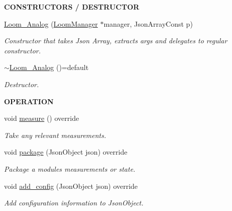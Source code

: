 \begin{Indent}{\bf C\+O\+N\+S\+T\+R\+U\+C\+T\+O\+RS / D\+E\+S\+T\+R\+U\+C\+T\+OR}
\begin{DoxyCompactItemize}
\hyperlink{class_loom___analog_a617a6b9c093fb8bb54abd3e55d051c0a}{Loom\+\_\+\+Analog} (\hyperlink{class_loom_manager}{Loom\+Manager} $\ast$manager, Json\+Array\+Const p)
\begin{DoxyCompactList}\small\item\em Constructor that takes Json Array, extracts args and delegates to regular constructor. \end{DoxyCompactList}\item 
\hyperlink{class_loom___analog_aa8d2a87c4c6ae72c1a943b95c96f2b53}{$\sim$\+Loom\+\_\+\+Analog} ()=default
\begin{DoxyCompactList}\small\item\em Destructor. \end{DoxyCompactList}\end{DoxyCompactItemize}
\end{Indent}
\begin{Indent}{\bf O\+P\+E\+R\+A\+T\+I\+ON}\par
\begin{DoxyCompactItemize}
\item 
void \hyperlink{class_loom___analog_afa90bbf4d632fe9b3168567cfc605f77}{measure} () override
\begin{DoxyCompactList}\small\item\em Take any relevant measurements. \end{DoxyCompactList}\item 
void \hyperlink{class_loom___analog_ab22f3a9b0d5c78feb1e53cf565483385}{package} (Json\+Object json) override
\begin{DoxyCompactList}\small\item\em Package a modules measurements or state. \end{DoxyCompactList}\item 
void \hyperlink{class_loom___analog_ad74305d4a8d7f705072561b92e7b7c68}{add\+\_\+config} (Json\+Object json) override
\begin{DoxyCompactList}\small\item\em Add configuration information to Json\+Object. \end{DoxyCompactList}\end{DoxyCompactItemize}
\end{Indent}
